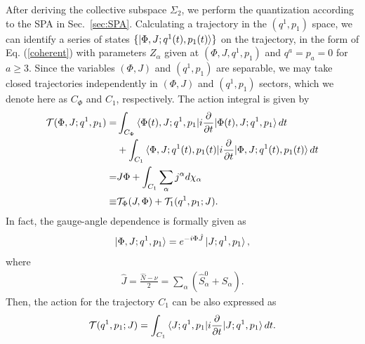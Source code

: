 \documentclass[11pt]{book} %
\begin{document}
After deriving the collective subspace $\Sigma_2$, 
we perform the quantization according to the SPA in Sec.~\ref{sec:SPA}.
Calculating a trajectory in the $(q^1,p_1)$ space,
we can identify a series of states $\{\ket{\Phi,J;q^1(t),p_1(t)}\}$
on the trajectory,
in the form of Eq. (\ref{coherent})
with parameters $Z_\alpha$ given at $(\Phi,J,q^1,p_1)$ and $q^a=p_a=0$ for
$a\geq 3$.
Since the variables $(\Phi,J)$ and $(q^1,p_1)$ are separable,
we may take closed trajectories independently in $(\Phi,J)$ and $(q^1,p_1)$
sectors, which we denote here as $C_\Phi$ and $C_1$, respectively.
The action integral is given by
\begin{align}
\mathcal{T}(\Phi,J;q^1,p_1)
=& \int_{C_\Phi} \braket{\Phi(t),J;q^1,p_1|i\frac{\partial}{\partial t}|\Phi(t),J;q^1,p_1} dt \nonumber \\
&+ \int_{C_1} \braket{\Phi,J;q^1(t),p_1(t)|i\frac{\partial}{\partial t}|\Phi,J;q^1(t),p_1(t)} dt
 \nonumber \\
	=& J\Phi + \int_{C_1} \sum_\alpha j^\alpha d\chi_\alpha
	\nonumber \\
	\equiv& \mathcal{T}_\Phi(J,\Phi) +\mathcal{T}_1(q^1,p_1;J) .
\end{align}
In fact, the gauge-angle dependence is formally given as
\begin{equation}
  \ket{\Phi,J;q^1,p_1} = e^{-i\Phi \hat{J}} \ket{J;q^1,p_1},
\end{equation}
where 
\begin{align}
	\hat{J} = \frac{\hat{N}-\nu}{2} = \sum_{\alpha} (\hat{S}_{\alpha}^0 + S_{\alpha}).
\end{align}
Then, the action for the trajectory $C_1$ can be also expressed as
\begin{align}
\mathcal{T}(q^1,p_1;J)=
 \int_{C_1} \braket{J;q^1,p_1|i\frac{\partial}{\partial t}|J;q^1,p_1} dt.
\end{align}
\end{document}

